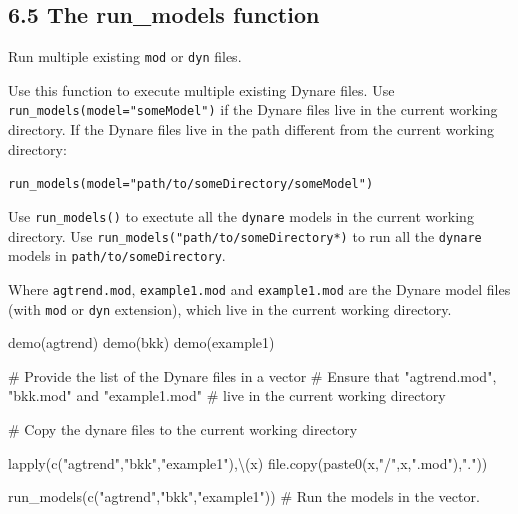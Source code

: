 \documentclass[
  12pt,
  legalpaperpaper,
  DIV=11,
  numbers=noendperiod]{scrartcl}
\newenvironment{Shaded}{\begin{snugshade}}{\end{snugshade}}
\newcommand{\CommentTok}[1]{\textcolor[rgb]{0.37,0.37,0.37}{#1}}
\newcommand{\FunctionTok}[1]{\textcolor[rgb]{0.28,0.35,0.67}{#1}}
\newcommand{\NormalTok}[1]{\textcolor[rgb]{0.00,0.23,0.31}{#1}}
\newcommand{\StringTok}[1]{\textcolor[rgb]{0.13,0.47,0.30}{#1}}
\begin{document}
\hypertarget{the-run_models-function}{%
\subsection{6.5 The run\_models
function}\label{the-run_models-function}}

Run multiple existing \texttt{mod} or \texttt{dyn} files.

Use this function to execute multiple existing Dynare files. Use
\texttt{run\_models(model="someModel")} if the Dynare files live in the
current working directory. If the Dynare files live in the path
different from the current working directory:

\texttt{run\_models(model="path/to/someDirectory/someModel")}

Use \texttt{run\_models()} to exectute all the \texttt{dynare} models in
the current working directory. Use
\texttt{run\_models("path/to/someDirectory*)} to run all the
\texttt{dynare} models in \texttt{path/to/someDirectory}.

Where \texttt{agtrend.mod}, \texttt{example1.mod} and
\texttt{example1.mod} are the Dynare model files (with \texttt{mod} or
\texttt{dyn} extension), which live in the current working directory.

\begin{Shaded}
\begin{Highlighting}[]
\FunctionTok{demo}\NormalTok{(agtrend)}
\FunctionTok{demo}\NormalTok{(bkk)}
\FunctionTok{demo}\NormalTok{(example1)}

\CommentTok{\# Provide the list of the \textasciigrave{}Dynare\textasciigrave{} files in a vector}
\CommentTok{\# Ensure that "agtrend.mod", "bkk.mod" and "example1.mod"}
\CommentTok{\# live in the current working directory}

\CommentTok{\# Copy the dynare files to the current working directory}

\FunctionTok{lapply}\NormalTok{(}\FunctionTok{c}\NormalTok{(}\StringTok{"agtrend"}\NormalTok{,}\StringTok{"bkk"}\NormalTok{,}\StringTok{"example1"}\NormalTok{),\textbackslash{}(x) }\FunctionTok{file.copy}\NormalTok{(}\FunctionTok{paste0}\NormalTok{(x,}\StringTok{"/"}\NormalTok{,x,}\StringTok{".mod"}\NormalTok{),}\StringTok{"."}\NormalTok{))}

\FunctionTok{run\_models}\NormalTok{(}\FunctionTok{c}\NormalTok{(}\StringTok{"agtrend"}\NormalTok{,}\StringTok{"bkk"}\NormalTok{,}\StringTok{"example1"}\NormalTok{)) }\CommentTok{\# Run the models in the vector.}
\end{Highlighting}
\end{Shaded}
\end{document}

